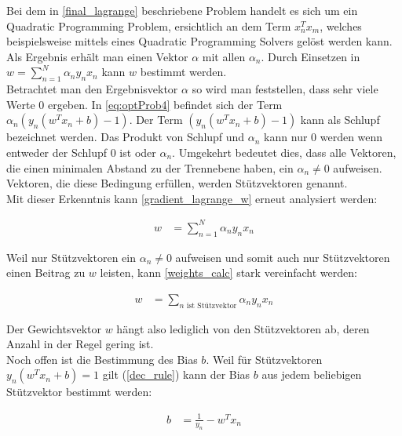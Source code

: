 \documentclass[a4paper,11pt,twoside]{scrreprt}
\begin{document}
Bei dem in \autoref{final_lagrange} beschriebene Problem handelt es sich um ein Quadratic Programming Problem, ersichtlich an dem Term $x_{n}^{T} x_{m}$, welches beispielsweise mittels eines Quadratic Programming Solvers gelöst werden kann. Als Ergebnis erhält man einen Vektor $\alpha$ mit allen $\alpha_{n}$. Durch Einsetzen in $w = \sum_{n=1}^{N} \alpha_{n} y_{n} x_{n}$ kann $w$ bestimmt werden. \\

Betrachtet man den Ergebnisvektor $\alpha$ so wird man feststellen, dass sehr viele Werte $0$ ergeben. In \autoref{eq:optProb4} befindet sich der Term $\alpha_{n} (y_n (w^{T} x_{n} + b)-1)$. Der Term $(y_n (w^{T} x_{n} + b)-1)$ kann als Schlupf bezeichnet werden. Das Produkt von Schlupf und $\alpha_{n}$ kann nur $0$ werden wenn entweder der Schlupf $0$ ist oder $\alpha_{n}$. Umgekehrt bedeutet dies, dass alle Vektoren, die einen minimalen Abstand zu der Trennebene haben, ein $\alpha_{n} \neq 0$ aufweisen. Vektoren, die diese Bedingung erfüllen, werden Stützvektoren genannt. \\


Mit dieser Erkenntnis kann \autoref{gradient_lagrange_w} erneut analysiert werden:

\begin{equation} \label{weights_calc}
	\begin{aligned}
		w &= \sum_{n=1}^{N} \alpha_{n} y_{n} x_{n}
	\end{aligned}
\end{equation}

Weil nur Stützvektoren ein $\alpha_{n} \neq 0$ aufweisen und somit auch nur Stützvektoren einen Beitrag zu $w$ leisten, kann \autoref{weights_calc} stark vereinfacht werden:

\begin{equation} \label{weights_calc2}
	\begin{aligned}
		w &= \sum_{n \text{ ist Stützvektor}} \alpha_{n} y_{n} x_{n}
	\end{aligned}
\end{equation}

Der Gewichtsvektor $w$ hängt also lediglich von den Stützvektoren ab, deren Anzahl in der Regel gering ist.\\


Noch offen ist die Bestimmung des Bias $b$. Weil für Stützvektoren $y_n (w^{T} x_{n} + b) = 1$ gilt (\autoref{dec_rule}) kann der Bias $b$ aus jedem beliebigen Stützvektor bestimmt werden:

\begin{equation} \label{bias_calc}
	\begin{aligned}
		b &= \frac{1}{y_{n}} - w^{T} x_{n}
	\end{aligned}
\end{equation}
\end{document}
